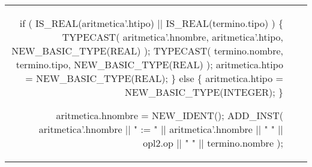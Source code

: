 \begin{tabular}{r c p{}}
{                                                                                                            if ( IS_REAL(aritmetica'.htipo) || IS_REAL(termino.tipo) )
                                                                                                                \{
                                                                                                                    TYPECAST( aritmetica'.hnombre, aritmetica'.htipo, NEW_BASIC_TYPE(REAL) );
                                                                                                                    TYPECAST( termino.nombre, termino.tipo, NEW_BASIC_TYPE(REAL) );
                                                                                                                    aritmetica.htipo = NEW_BASIC_TYPE(REAL);
                                                                                                                \}
                                                                                                            else
                                                                                                            \{
                                                                                                                aritmetica.htipo = NEW_BASIC_TYPE(INTEGER);
                                                                                                            \}

                                                                                                            aritmetica.hnombre = NEW_IDENT();
                                                                                                            ADD_INST( aritmetica'.hnombre || " := " || aritmetica'.hnombre || " " || opl2.op || " " || termino.nombre );

}
\end{tabular}
